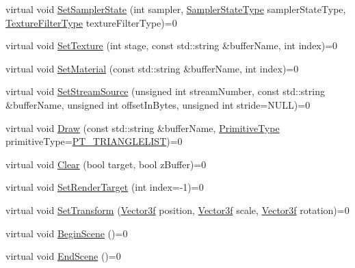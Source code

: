 \begin{DoxyCompactItemize}
virtual void \mbox{\hyperlink{classse_1_1_abstract_renderer_a1abafecf778ef68a08ba44b88ded6abe}{Set\+Sampler\+State}} (int sampler, \mbox{\hyperlink{namespacese_acff8e236c539422281bbc908758e0fb7}{Sampler\+State\+Type}} sampler\+State\+Type, \mbox{\hyperlink{namespacese_a13bef3f1227abf2f6bc06b97a4ea6cdf}{Texture\+Filter\+Type}} texture\+Filter\+Type)=0
\item 
virtual void \mbox{\hyperlink{classse_1_1_abstract_renderer_aa7fc2284df16ba0b42059560599ff013}{Set\+Texture}} (int stage, const std\+::string \&buffer\+Name, int index)=0
\item 
virtual void \mbox{\hyperlink{classse_1_1_abstract_renderer_a1253152682a025722fd97d4bfa981d45}{Set\+Material}} (const std\+::string \&buffer\+Name, int index)=0
\item 
virtual void \mbox{\hyperlink{classse_1_1_abstract_renderer_a62027b239c98c7a5b3a347e737d83fbe}{Set\+Stream\+Source}} (unsigned int stream\+Number, const std\+::string \&buffer\+Name, unsigned int offset\+In\+Bytes, unsigned int stride=N\+U\+LL)=0
\item 
virtual void \mbox{\hyperlink{classse_1_1_abstract_renderer_ae743059a7b35a9bc1c9108613b43f42f}{Draw}} (const std\+::string \&buffer\+Name, \mbox{\hyperlink{namespacese_a2b33c0ed67b2f6ac40fc08d56b5984f9}{Primitive\+Type}} primitive\+Type=\mbox{\hyperlink{namespacese_a2b33c0ed67b2f6ac40fc08d56b5984f9ae5169632705e9235a4423477202499c1}{P\+T\+\_\+\+T\+R\+I\+A\+N\+G\+L\+E\+L\+I\+ST}})=0
\item 
virtual void \mbox{\hyperlink{classse_1_1_abstract_renderer_a2857e7bb3803682f94fb53e305da24e4}{Clear}} (bool target, bool z\+Buffer)=0
\item 
virtual void \mbox{\hyperlink{classse_1_1_abstract_renderer_a5cf80b0b47191f9445d6a5fa5fc02a3e}{Set\+Render\+Target}} (int index=-\/1)=0
\item 
virtual void \mbox{\hyperlink{classse_1_1_abstract_renderer_afe47dd77096e92a25260cacb50631d8f}{Set\+Transform}} (\mbox{\hyperlink{namespacese_a12e07512d95e2fdebdaf74a5ea2cf5f6}{Vector3f}} position, \mbox{\hyperlink{namespacese_a12e07512d95e2fdebdaf74a5ea2cf5f6}{Vector3f}} scale, \mbox{\hyperlink{namespacese_a12e07512d95e2fdebdaf74a5ea2cf5f6}{Vector3f}} rotation)=0
\item 
virtual void \mbox{\hyperlink{classse_1_1_abstract_renderer_aae5f9f2f51f290846e4ffd9e2a3d2a8e}{Begin\+Scene}} ()=0
\item 
virtual void \mbox{\hyperlink{classse_1_1_abstract_renderer_a4329c70d64528cdc5bfcd5e6dee3f2e3}{End\+Scene}} ()=0

\end{DoxyCompactItemize}
